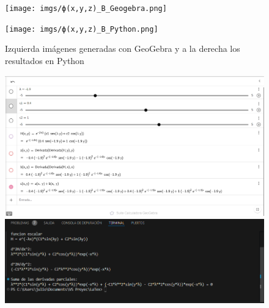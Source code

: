 \documentclass{article}
\begin{document}
\begin{figure}[h!]
    \vspace{0.5cm}
    
    \begin{minipage}{0.45\textwidth}
        \centering
        \texttt{[image: imgs/ϕ(x,y,z)\_B\_Geogebra.png]}
    \end{minipage}
    \hfill
    \begin{minipage}{0.45\textwidth}
        \centering
        \texttt{[image: imgs/ϕ(x,y,z)\_B\_Python.png]}
    \end{minipage}
    
    \caption{Izquierda imágenes generadas con GeoGebra y a la derecha los resultados en Python}
\end{figure}

\begin{figure}[h!]
    \centering
    \begin{minipage}{0.45\textwidth}
        \centering
        \includegraphics[width=\textwidth]{imgs/derivada_parcial_+_Geogebra.png}
    \end{minipage}
    \hfill
    \begin{minipage}{0.45\textwidth}
        \centering
        \includegraphics[width=\textwidth]{imgs/derivada_parcial_+_Python.png}
    \end{minipage}
    
    \vspace{0.5cm}
    

\end{figure}
\end{document}
